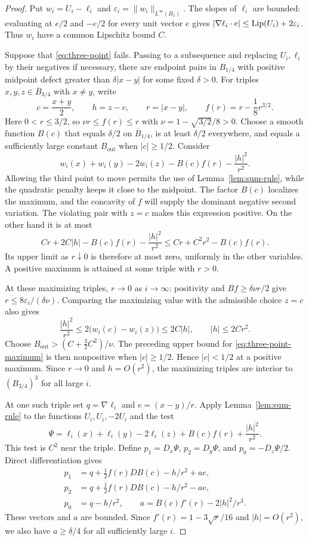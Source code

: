 \begin{proof}
Put $w_i=U_i-\ell_i$ and $\varepsilon_i=\|w_i\|_{L^\infty(B_1)}$. The slopes of $\ell_i$ are bounded: evaluating at $e/2$ and $-e/2$ for every unit vector $e$ gives $|\nabla\ell_i\cdot e|\le\operatorname{Lip}(U_i)+2\varepsilon_i$. Thus $w_i$ have a common Lipschitz bound $C$.

Suppose that \eqref{eq:three-point} fails. Passing to a subsequence and replacing $U_i,\ell_i$ by their negatives if necessary, there are endpoint pairs in $B_{1/4}$ with positive midpoint defect greater than $\delta|x-y|$ for some fixed $\delta>0$. For triples $x,y,z\in\overline B_{3/4}$ with $x\ne y$, write
\[
  c=\frac{x+y}{2},\qquad h=z-c,\qquad r=|x-y|,
  \qquad f(r)=r-\frac18r^{3/2}.
\]
Here $0<r\le3/2$, so $\nu r\le f(r)\le r$ with $\nu=1-\sqrt{3/2}/8>0$. Choose a smooth function $B(c)$ that equals $\delta/2$ on $\overline B_{1/4}$, is at least $\delta/2$ everywhere, and equals a sufficiently large constant $B_{\mathrm{out}}$ when $|c|\ge1/2$. Consider
\begin{equation}\label{eq:three-point-maximum}
  w_i(x)+w_i(y)-2w_i(z)-B(c)f(r)-\frac{|h|^2}{r^2}.
\end{equation}
Allowing the third point to move permits the use of Lemma~\ref{lem:sum-rule}, while the quadratic penalty keeps it close to the midpoint. The factor $B(c)$ localizes the maximum, and the concavity of $f$ will supply the dominant negative second variation.
The violating pair with $z=c$ makes this expression positive. On the other hand it is at most
\[
  Cr+2C|h|-B(c)f(r)-\frac{|h|^2}{r^2}
  \le Cr+C^2r^2-B(c)f(r).
\]
Its upper limit as $r\downarrow0$ is therefore at most zero, uniformly in the other variables. A positive maximum is attained at some triple with $r>0$.

At these maximizing triples, $r\to0$ as $i\to\infty$: positivity and $Bf\ge\delta\nu r/2$ give $r\le8\varepsilon_i/(\delta\nu)$. Comparing the maximizing value with the admissible choice $z=c$ also gives
\[
  \frac{|h|^2}{r^2}\le2\bigl(w_i(c)-w_i(z)\bigr)\le2C|h|,
  \qquad |h|\le2Cr^2.
\]
Choose $B_{\mathrm{out}}>(C+\tfrac32C^2)/\nu$. The preceding upper bound for \eqref{eq:three-point-maximum} is then nonpositive when $|c|\ge1/2$. Hence $|c|<1/2$ at a positive maximum. Since $r\to0$ and $h=O(r^2)$, the maximizing triples are interior to $(B_{3/4})^3$ for all large $i$.

At one such triple set $q=\nabla\ell_i$ and $e=(x-y)/r$. Apply Lemma~\ref{lem:sum-rule} to the functions $U_i,U_i,-2U_i$ and the test
\[
  \Psi=\ell_i(x)+\ell_i(y)-2\ell_i(z)+B(c)f(r)+\frac{|h|^2}{r^2}.
\]
This test is $C^2$ near the triple. Define $p_1=D_x\Psi$, $p_2=D_y\Psi$, and $p_0=-D_z\Psi/2$. Direct differentiation gives
\begin{align*}
  p_1&=q+\tfrac12f(r)DB(c)-h/r^2+a e,\\
  p_2&=q+\tfrac12f(r)DB(c)-h/r^2-a e,\\
  p_0&=q-h/r^2,\qquad
  a=B(c)f'(r)-2|h|^2/r^3.
\end{align*}
These vectors and $a$ are bounded. Since $f'(r)=1-3\sqrt r/16$ and $|h|=O(r^2)$, we also have $a\ge\delta/4$ for all sufficiently large $i$.


\end{proof}

